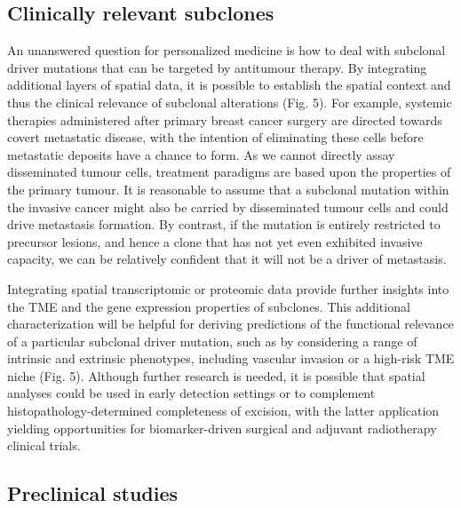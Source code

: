 \subsection*{Clinically relevant subclones}
An unanswered question for personalized medicine is how to deal with subclonal driver mutations that can be targeted by antitumour therapy. By integrating additional layers of spatial data, it is possible to establish the spatial context and thus the clinical relevance of subclonal alterations \parencite{Lomakin2022-ks,Gonzalez-Silva2020-fn} (Fig. 5). For example, systemic therapies administered after primary breast cancer surgery are directed towards covert metastatic disease, with the intention of eliminating these cells before metastatic deposits have a chance to form. As we cannot directly assay disseminated tumour cells, treatment paradigms are based upon the properties of the primary tumour. It is reasonable to assume that a subclonal mutation within the invasive cancer might also be carried by disseminated tumour cells and could drive metastasis formation. By contrast, if the mutation is entirely restricted to precursor lesions, and hence a clone that has not yet even exhibited invasive capacity, we can be relatively confident that it will not be a driver of metastasis.

Integrating spatial transcriptomic or proteomic data provide further insights into the \ac{TME} and the gene expression properties of subclones. This additional characterization will be helpful for deriving predictions of the functional relevance of a particular subclonal driver mutation, such as by considering a range of intrinsic and extrinsic phenotypes, including vascular invasion or a high-risk \ac{TME} niche (Fig. 5). Although further research is needed, it is possible that spatial analyses could be used in early detection settings or to complement histopathology-determined completeness of excision, with the latter application yielding opportunities for biomarker-driven surgical and adjuvant radiotherapy clinical trials.

\subsection*{Preclinical studies}

